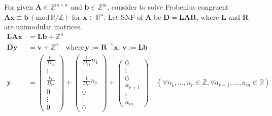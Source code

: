 For given $\bm{A} \in \mathbb{Z}^{m \times n}$ and $\bm{b} \in \mathbb{Z}^{m}$, consider to solve Frobenius congruent $\bm{Ax} \equiv \bm{b} \, (\mathrm{mod}\, \mathbb{R}/\mathbb{Z})$ for $\bm{x} \in \mathbb{R}^{n}$.
Let SNF of $\bm{A}$ be $\bm{D} = \bm{LAR}$, where $\bm{L}$ and $\bm{R}$ are unimodular matrices.
\begin{align}
  \bm{LAx} &= \bm{Lb} + \mathbb{Z}^{n} \\
  \bm{Dy}  &= \bm{v} + \mathbb{Z}^{n} \quad \mbox{where}\, \bm{y}:= \bm{R}^{-1} \bm{x},\, \bm{v}:= \bm{Lb} \\
  \bm{y}
    &= \begin{pmatrix} \frac{v_{1}}{D_{11}} \\ \vdots \\ \frac{v_{r}}{D_{rr}} \\ 0 \\ \vdots \\ 0 \end{pmatrix}
        + \begin{pmatrix} \frac{1}{D_{11}} n_{1} \\ \vdots \\ \frac{1}{D_{rr}} n_{r} \\ 0 \\ \vdots \\ 0 \end{pmatrix}
        + \begin{pmatrix} 0 \\ \vdots \\ 0 \\ a_{r+1} \\ \vdots \\ a_{m} \end{pmatrix}
        \quad (\forall n_{1}, \dots, n_{r} \in \mathbb{Z}, \forall a_{r+1}, \dots, a_{m} \in \mathbb{R})
\end{align}
